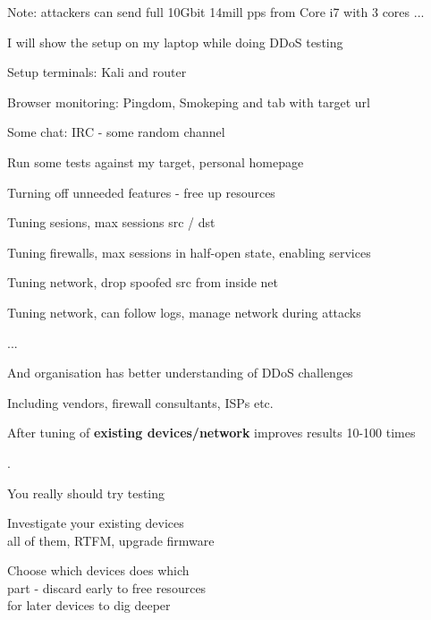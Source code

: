 \documentclass[Screen16to9,17pt]{foils}
\begin{document}
\vskip 2cm
Note: attackers can send full 10Gbit 14mill pps from Core i7 with 3 cores ...



\begin{list1}
\item I will show the setup on my laptop while doing DDoS testing
\begin{list2}
\item Setup terminals: Kali and router
\item Browser monitoring: Pingdom, Smokeping and tab with target url
\item Some chat: IRC - some random channel
\end{list2}
\item Run some tests against my target, personal homepage
\end{list1}


\begin{list1}
\item Turning off unneeded features - free up resources
\item Tuning sesions, max sessions src / dst
\item Tuning firewalls, max sessions in half-open state, enabling services
\item Tuning network, drop spoofed src from inside net \smiley
\item Tuning network, can follow logs, manage network during attacks
\item ...
\item And organisation has better understanding of DDoS challenges
\item Including vendors, firewall consultants, ISPs etc.
\end{list1}

\vskip 1cm
\centerline{After tuning of {\bf existing devices/network} improves results 10-100 times}


.
\begin{list1}
\item You really should try testing
\item Investigate your existing devices\\
all of them, RTFM, upgrade firmware
\item Choose which devices does which\\
part - discard early to free resources\\
for later devices to dig deeper
\end{list1}
\end{document}
